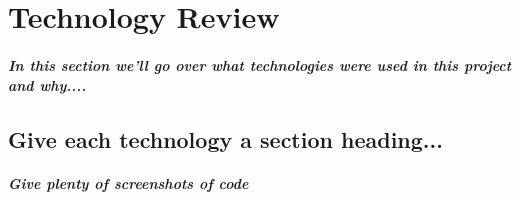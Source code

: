 \chapter{Technology Review}
\paragraph{In this section we'll go over what technologies were used in this project and why....}
\section{Give each technology a section heading...}
\paragraph{Give plenty of screenshots of code }